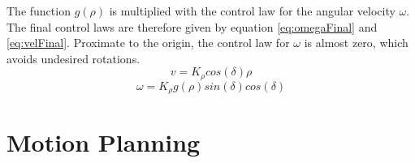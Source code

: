 \documentclass[a4paper, 11pt]{article}
\begin{document}
\noindent
The function $g(\rho)$ is multiplied with the control law for the angular velocity $\omega$. The final control laws are therefore given by equation \eqref{eq:omegaFinal} and \eqref{eq:velFinal}. Proximate to the origin, the control law for $\omega$ is almost zero, which avoids undesired rotations.
\begin{equation}
\boxed{v= K_{\rho} cos(\delta) \rho}
\label{eq:velFinal}	
\end{equation} 
\begin{equation}
	\boxed{\omega = K_{\rho} g(\rho) sin(\delta) cos(\delta)}
	\label{eq:omegaFinal}	
\end{equation}


\section{Motion Planning}
\end{document}

